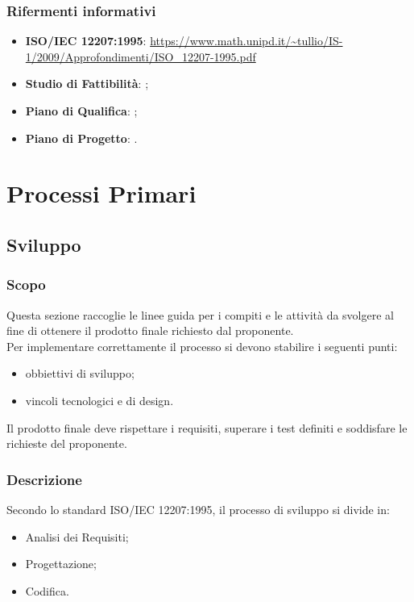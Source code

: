 \documentclass[]{article}
\begin{document}
			\subsubsection{Rifermenti informativi}
			\begin{itemize}
				\item \textbf{ISO/IEC 12207:1995}: \url{https://www.math.unipd.it/~tullio/IS-1/2009/Approfondimenti/ISO_12207-1995.pdf}
				\item \textbf{Studio di Fattibilità}: ; %
				\item \textbf{Piano di Qualifica}: ;
				\item \textbf{Piano di Progetto}: .
			\end{itemize}

		\newpage
		\section{Processi Primari}
		
		
			\newpage
			\subsection{Sviluppo}
			
				\subsubsection{Scopo}
				Questa sezione raccoglie le linee guida per i compiti e le attività da svolgere al fine di ottenere il prodotto finale richiesto dal proponente. \\
				Per implementare correttamente il processo si devono stabilire i seguenti punti:
				\begin{itemize}
					\item obbiettivi di sviluppo;
					\item vincoli tecnologici e di design.
				\end{itemize}
				Il prodotto finale deve rispettare i requisiti, superare i test definiti e soddisfare le richieste del proponente.
				\subsubsection{Descrizione}
				Secondo lo standard ISO/IEC 12207:1995, il processo di sviluppo si divide in:
				\begin{itemize}
					\item Analisi dei Requisiti;
					\item Progettazione;
					\item Codifica.
				\end{itemize}
			
\end{document}
